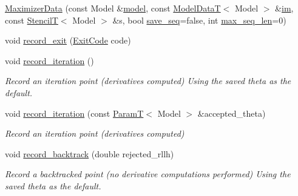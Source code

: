 \begin{DoxyCompactItemize}
\item 
\hyperlink{classmappel_1_1IterativeMaximizer_1_1MaximizerData_aa14baec5beb341270a0f09f0d3ff5481}{Maximizer\+Data} (const Model \&\hyperlink{classmappel_1_1Estimator_a8322546d87ccdf01f8b0dcd9dae509f0}{model}, const \hyperlink{namespacemappel_a97f050df953605381ae9c901c3b125f1}{Model\+DataT}$<$ Model $>$ \&\hyperlink{classmappel_1_1IterativeMaximizer_1_1MaximizerData_afcee3fa283be1a9ba1d197ed777d447c}{im}, const \hyperlink{namespacemappel_a3a06598240007876f8c4bf834ad86197}{StencilT}$<$ Model $>$ \&s, bool \hyperlink{classmappel_1_1IterativeMaximizer_1_1MaximizerData_af13babebeb16147883db7af0b4875b53}{save\+\_\+seq}=false, int \hyperlink{classmappel_1_1IterativeMaximizer_1_1MaximizerData_aee106ddaebe30496f5280095fc01301a}{max\+\_\+seq\+\_\+len}=0)
\item 
void \hyperlink{classmappel_1_1IterativeMaximizer_1_1MaximizerData_af2e61c659a8cc78365bd801026c2f6a9}{record\+\_\+exit} (\hyperlink{classmappel_1_1IterativeMaximizer_a5dc8660cf33abf3f3a576f051466521c}{Exit\+Code} code)
\item 
void \hyperlink{classmappel_1_1IterativeMaximizer_1_1MaximizerData_a1096048bf29ccbc45e4a60dc6cbf7b2c}{record\+\_\+iteration} ()
\begin{DoxyCompactList}\small\item\em Record an iteration point (derivatives computed) Using the saved theta as the default. \end{DoxyCompactList}\item 
void \hyperlink{classmappel_1_1IterativeMaximizer_1_1MaximizerData_a9eca9cd87534fa88ff6b1116853123d0}{record\+\_\+iteration} (const \hyperlink{namespacemappel_a667925cb0d6c0e49f2f035cc5a9a6857}{ParamT}$<$ Model $>$ \&accepted\+\_\+theta)
\begin{DoxyCompactList}\small\item\em Record an iteration point (derivatives computed) \end{DoxyCompactList}\item 
void \hyperlink{classmappel_1_1IterativeMaximizer_1_1MaximizerData_a8c82784b23315be8f74b968ee4188388}{record\+\_\+backtrack} (double rejected\+\_\+rllh)
\begin{DoxyCompactList}\small\item\em Record a backtracked point (no derivative computations performed) Using the saved theta as the default. \end{DoxyCompactList}\item 

\end{DoxyCompactItemize}
